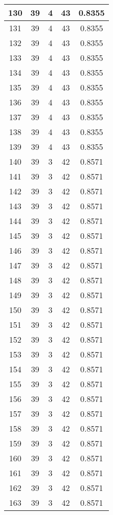 \documentclass[letterpaper, 12pt]{article}
\begin{document}
\begin{longtable}{|c|c|c|c|c|}
\hline
130 & 39 & 4 & 43 & 0.8355 \\
\hline
131 & 39 & 4 & 43 & 0.8355 \\
\hline
132 & 39 & 4 & 43 & 0.8355 \\
\hline
133 & 39 & 4 & 43 & 0.8355 \\
\hline
134 & 39 & 4 & 43 & 0.8355 \\
\hline
135 & 39 & 4 & 43 & 0.8355 \\
\hline
136 & 39 & 4 & 43 & 0.8355 \\
\hline
137 & 39 & 4 & 43 & 0.8355 \\
\hline
138 & 39 & 4 & 43 & 0.8355 \\
\hline
139 & 39 & 4 & 43 & 0.8355 \\
\hline
140 & 39 & 3 & 42 & 0.8571 \\
\hline
141 & 39 & 3 & 42 & 0.8571 \\
\hline
142 & 39 & 3 & 42 & 0.8571 \\
\hline
143 & 39 & 3 & 42 & 0.8571 \\
\hline
144 & 39 & 3 & 42 & 0.8571 \\
\hline
145 & 39 & 3 & 42 & 0.8571 \\
\hline
146 & 39 & 3 & 42 & 0.8571 \\
\hline
147 & 39 & 3 & 42 & 0.8571 \\
\hline
148 & 39 & 3 & 42 & 0.8571 \\
\hline
149 & 39 & 3 & 42 & 0.8571 \\
\hline
150 & 39 & 3 & 42 & 0.8571 \\
\hline
151 & 39 & 3 & 42 & 0.8571 \\
\hline
152 & 39 & 3 & 42 & 0.8571 \\
\hline
153 & 39 & 3 & 42 & 0.8571 \\
\hline
154 & 39 & 3 & 42 & 0.8571 \\
\hline
155 & 39 & 3 & 42 & 0.8571 \\
\hline
156 & 39 & 3 & 42 & 0.8571 \\
\hline
157 & 39 & 3 & 42 & 0.8571 \\
\hline
158 & 39 & 3 & 42 & 0.8571 \\
\hline
159 & 39 & 3 & 42 & 0.8571 \\
\hline
160 & 39 & 3 & 42 & 0.8571 \\
\hline
161 & 39 & 3 & 42 & 0.8571 \\
\hline
162 & 39 & 3 & 42 & 0.8571 \\
\hline
163 & 39 & 3 & 42 & 0.8571 \\

\end{longtable}
\end{document}
